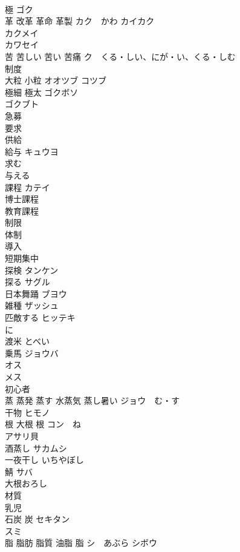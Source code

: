 \documentclass[8pt]{extreport}
\begin{document}
\begin{CJK}{UTF8}{min}
\\	極	ゴク 
\\	革 改革 革命 革製	カク　かわ カイカク 
\\	カクメイ 
\\	カワセイ 
\\	苦 苦しい 苦い 苦痛	ク　くる・しい、にが・い、くる・しむ 
\\	制度	
\\	大粒 小粒	オオツブ コツブ
\\	極細 極太	ゴクボソ 
\\	ゴクブト 
\\	急募	
\\	要求	
\\	供給	
\\	給与	キュウヨ 
\\	求む	
\\	与える	
\\	課程	カテイ 
\\	博士課程 
\\	教育課程 
\\	制限	
\\	体制	
\\	導入	
\\	短期集中	
\\	探検	タンケン 
\\	探る	サグル 
\\	日本舞踊	ブヨウ 
\\	雑種	ザッシュ 
\\	匹敵する	ヒッテキ 
\\	に
\\	渡米	とべい 
\\	乗馬	ジョウバ 
\\	オス	
\\	メス	
\\	初心者	
\\	蒸 蒸発 蒸す 水蒸気 蒸し暑い	ジョウ　む・す 
\\	干物	ヒモノ 
\\	根 大根 根	コン　ね 
\\	アサリ貝	
\\	酒蒸し	サカムシ 
\\	一夜干し	いちやぼし 
\\	鯖	サバ 
\\	大根おろし	
\\	材質	
\\	乳児	
\\	石炭 炭	セキタン 
\\	スミ　　
\\	脂 脂肪 脂質 油脂 脂	シ　あぶら シボウ 

\end{CJK}
\end{document}
